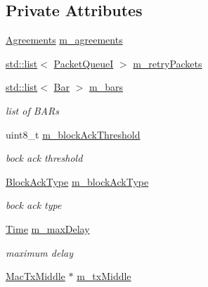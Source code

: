 \subsection*{Private Attributes}
\begin{DoxyCompactItemize}
\item 
\hyperlink{classns3_1_1BlockAckManager_aada7ad4c4011ce66e28aaa2bcb7aa915}{Agreements} \hyperlink{classns3_1_1BlockAckManager_a952a6b8b29705c83ba6464f7cf7ffe66}{m\+\_\+agreements}
\item 
\hyperlink{openflow-interface_8h_afd9bcfa176617760671b67580f536fa7}{std\+::list}$<$ \hyperlink{classns3_1_1BlockAckManager_a2bb94802381e70535e8a7c892fd01d48}{Packet\+QueueI} $>$ \hyperlink{classns3_1_1BlockAckManager_a2851f947dd68945ebc25961cff893ed9}{m\+\_\+retry\+Packets}
\item 
\hyperlink{openflow-interface_8h_afd9bcfa176617760671b67580f536fa7}{std\+::list}$<$ \hyperlink{structns3_1_1Bar}{Bar} $>$ \hyperlink{classns3_1_1BlockAckManager_af2339008509896569fe53c035f27c9b4}{m\+\_\+bars}
\begin{DoxyCompactList}\small\item\em list of B\+A\+Rs \end{DoxyCompactList}\item 
uint8\+\_\+t \hyperlink{classns3_1_1BlockAckManager_a310943df91ddcf02959cd646a3b9cbce}{m\+\_\+block\+Ack\+Threshold}
\begin{DoxyCompactList}\small\item\em bock ack threshold \end{DoxyCompactList}\item 
\hyperlink{namespacens3_a90f436472d19d7d7f37cbf0b8c288ff7}{Block\+Ack\+Type} \hyperlink{classns3_1_1BlockAckManager_aa3a0c2d7132c556a98a6672de7665cb5}{m\+\_\+block\+Ack\+Type}
\begin{DoxyCompactList}\small\item\em bock ack type \end{DoxyCompactList}\item 
\hyperlink{classns3_1_1Time}{Time} \hyperlink{classns3_1_1BlockAckManager_a5eabe70b6e25dac515f8ec6c38d45f75}{m\+\_\+max\+Delay}
\begin{DoxyCompactList}\small\item\em maximum delay \end{DoxyCompactList}\item 
\hyperlink{classns3_1_1MacTxMiddle}{Mac\+Tx\+Middle} $\ast$ \hyperlink{classns3_1_1BlockAckManager_a3c78348cca01da647d813f90d2463a44}{m\+\_\+tx\+Middle}

\end{DoxyCompactItemize}
